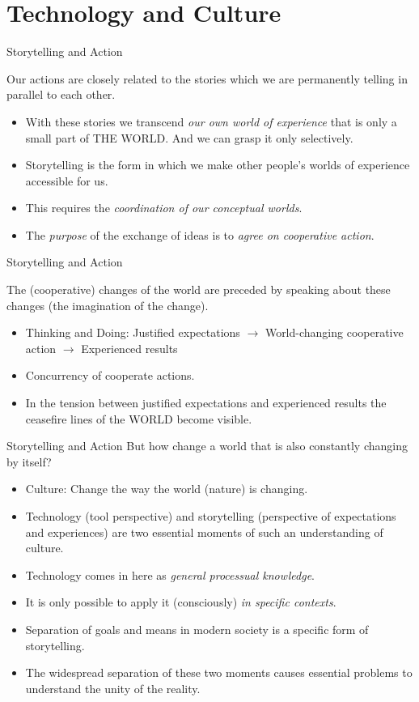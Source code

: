 \documentclass{beamer}
\title{Modelling Sustainable Systems\\ and Semantic Web\\[6pt] Information and
  Language \vskip1em}
\subtitle{Lecture in the Module 10-202-2312\\ for Master Computer Science}
\author{Prof. Dr. Hans-Gert Gräbe\\
\url{http://www.informatik.uni-leipzig.de/~graebe}}
\date{June 2022}
\begin{document}
{
\begin{frame}
  \titlepage
\end{frame}}

\section{Technology and Culture}
\begin{frame}{Storytelling and Action}
  
Our actions are closely related to the stories which we are permanently
telling in parallel to each other.
\begin{itemize}
\item With these stories we transcend \emph{our own world of experience} that
  is only a small part of THE WORLD. And we can grasp it only selectively.
\item Storytelling is the form in which we make other people's worlds of
  experience accessible for us.
\item This requires the \emph{coordination of our conceptual worlds}.
\item The \emph{purpose} of the exchange of ideas is to \emph{agree on
  cooperative action}.
\end{itemize}
\end{frame}
\begin{frame}{Storytelling and Action}

The (cooperative) changes of the world are preceded by speaking about these
changes (the imagination of the change).
\begin{itemize}
\item Thinking and Doing: Justified expectations $\to$ World-changing
  cooperative action $\to$ Experienced results
\item Concurrency of cooperate actions.
\item In the tension between justified expectations and experienced results
  the ceasefire lines of the WORLD become visible.
\end{itemize}
\end{frame}

\begin{frame}{Storytelling and Action}
But how change a world that is also constantly changing by itself?
\begin{itemize}
\item Culture: Change the way the world (nature) is changing.
\item Technology (tool perspective) and storytelling (perspective of
  expectations and experiences) are two essential moments of such an
  understanding of culture.
\item Technology comes in here as \emph{general processual knowledge}. 
\item It is only possible to apply it (consciously) \emph{in specific
  contexts}.
\item Separation of goals and means in modern society is a specific form of
  storytelling.
\item The widespread separation of these two moments causes essential problems
  to understand the unity of the reality.
\end{itemize}
\end{frame}
\end{document}
